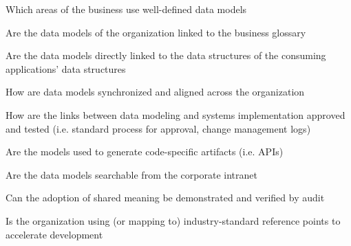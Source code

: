 \begin{core-questions}

  \item [\thesection.1] Which areas of the business use well-defined data models
  \item [\thesection.2] Are the data models of the organization linked to the business glossary
  \item [\thesection.3] Are the data models directly linked to the data structures of the consuming applications'
                        data structures
  \item [\thesection.4] How are data models synchronized and aligned across the organization
  \item [\thesection.5] How are the links between data modeling and systems implementation approved and tested
                        (i.e. standard process for approval, change management logs)
  \item [\thesection.6] Are the models used to generate code-specific artifacts (i.e. APIs)
  \item [\thesection.7] Are the data models searchable from the corporate intranet
  \item [\thesection.8] Can the adoption of shared meaning be demonstrated and verified by audit
  \item [\thesection.9] Is the organization using (or mapping to) industry-standard reference points to
                        accelerate development

\end{core-questions}

\kgmmscoringsection

\kgmmscoringlevelOne


